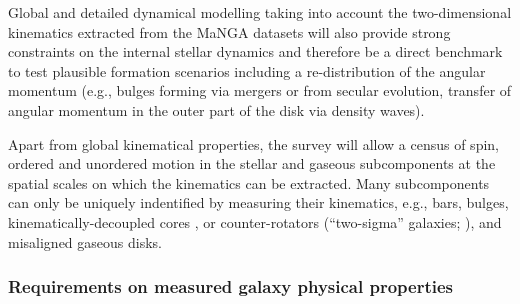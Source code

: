 \documentclass[preprint,11pt]{aastex}
\begin{document}
Global and detailed dynamical modelling taking into account the two-dimensional
kinematics extracted from the MaNGA datasets will also provide
strong constraints on the internal stellar dynamics and therefore 
be a direct benchmark to test plausible formation scenarios including
a re-distribution of the angular momentum (e.g., bulges forming via mergers
or from secular evolution, transfer of angular momentum in the outer part of the disk via density waves).

Apart from global kinematical properties, the survey will allow a
census of spin, ordered and unordered motion in the stellar and
gaseous subcomponents at the spatial scales on which the kinematics
can be extracted. Many subcomponents can only be uniquely indentified
by measuring their kinematics, e.g., bars, bulges,
kinematically-decoupled cores \citep{vandenbosch2008}, or
counter-rotators (``two-sigma'' galaxies; \citealt{krajnovic11}), and
misaligned gaseous disks.


\subsubsection{Requirements on measured galaxy physical properties}
\end{document}
